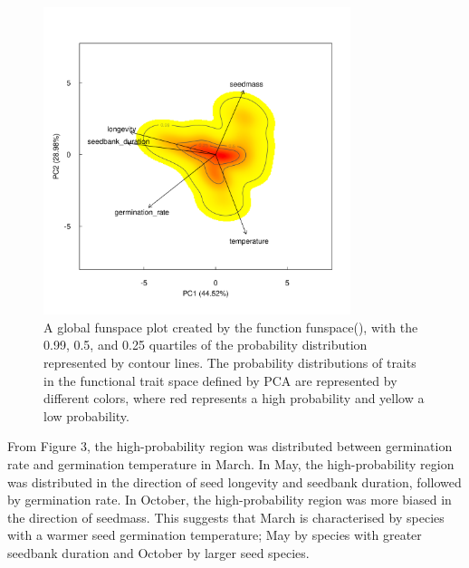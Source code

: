 \documentclass[a4paper, 11, margin=2cm]{article}
\begin{document}
      \begin{figure}[H]
        \centering
        \includegraphics[width=0.8\textwidth]{../result/plot/traitspace_global.png}
        \caption{A global funspace plot created by the function funspace(), with the 0.99, 0.5, and 0.25 quartiles of the probability distribution represented by contour lines. The probability distributions of traits in the functional trait space defined by PCA are represented by different colors, where red represents a high probability and yellow a low probability.}
      \end{figure}

    From Figure 3, the high-probability region was distributed between germination rate and germination temperature in March. In May, the high-probability region was distributed in the direction of seed longevity and seedbank duration, followed by germination rate. In October, the high-probability region was more biased in the direction of seedmass. This suggests that March is characterised by species with a warmer seed germination temperature; May by species with greater seedbank duration and October by larger seed species.
\end{document}
